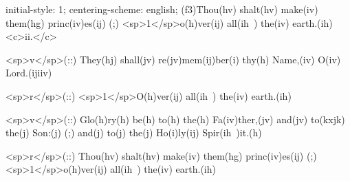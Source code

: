 initial-style: 1;
centering-scheme: english;
(f3)Thou(hv) shalt(hv) make(iv) them(hg) princ(iv)es(ij) (;) <sp>1</sp>o(h)ver(ij) all(ih~) the(iv) earth.(ih) <c>ii.</c>

<sp>v</sp>(::) They(hj) shall(jv) re(jv)mem(ij)ber(i) thy(h) Name,(iv) O(iv) Lord.(ijiiv)

<sp>r</sp>(::) <sp>1</sp>O(h)ver(ij) all(ih~) the(iv) earth.(ih)

<sp>v</sp>(::) Glo(h)ry(h) be(h) to(h) the(h) Fa(iv)ther,(jv) and(jv) to(kxjk) the(j) Son:(j) (;) and(j) to(j) the(j) Ho(i)ly(ij) Spir(ih~)it.(h)

<sp>r</sp>(::) Thou(hv) shalt(hv) make(iv) them(hg) princ(iv)es(ij) (;) <sp>1</sp>o(h)ver(ij) all(ih~) the(iv) earth.(ih)